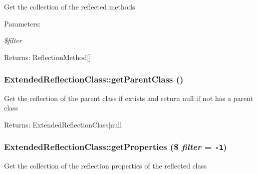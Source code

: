 Get the collection of the reflected methods

\begin{Desc}
\item[Parameters:]
\begin{description}
\item[{\em \$filter}]\end{description}
\end{Desc}
\begin{Desc}
\item[Returns:]ReflectionMethod\mbox{[}\mbox{]} \end{Desc}
\hypertarget{class_extended_reflection_class_dbce950becc27c205b461ff9c61aaec2}{
\subsubsection[{getParentClass}]{\setlength{\rightskip}{0pt plus 5cm}ExtendedReflectionClass::getParentClass ()}}
\label{class_extended_reflection_class_dbce950becc27c205b461ff9c61aaec2}


Get the reflection of the parent class if extists and return null if not has a parent class

\begin{Desc}
\item[Returns:]ExtendedReflectionClass$|$null \end{Desc}
\hypertarget{class_extended_reflection_class_8f6bf6f713d03f9ffedf453e65155eab}{
\subsubsection[{getProperties}]{\setlength{\rightskip}{0pt plus 5cm}ExtendedReflectionClass::getProperties (\$ {\em filter} = {\tt -1})}}
\label{class_extended_reflection_class_8f6bf6f713d03f9ffedf453e65155eab}


Get the collection of the reflection properties of the reflected class

